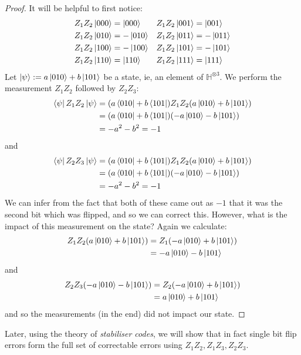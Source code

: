 \documentclass[12pt]{article}
\theoremstyle{plain}
\theoremstyle{definition}
\newcommand{\bb}[1]{\mathbb{#1}}
\begin{document}
\begin{proof}
	It will be helpful to first notice:
	\begin{align*}
		Z_1Z_2\ket{000} &= \ket{000} & Z_1Z_2\ket{001} &= \ket{001}\\
		Z_1Z_2\ket{010} &= -\ket{010} & Z_1Z_2\ket{011} &= -\ket{011}\\
		Z_1Z_2\ket{100} &= -\ket{100} & Z_1Z_2\ket{101} &= -\ket{101}\\
		Z_1Z_2\ket{110} &= \ket{110} &Z_1Z_2 \ket{111} &= \ket{111}
	\end{align*}
	Let $\ket{\psi}:= a\ket{010} + b\ket{101}$ be a state, ie, an element of $\bb{H}^{\otimes 3}$. We perform the measurement $Z_1Z_2$ followed by $Z_2Z_3$:
	\begin{align*}
		\bra{\psi}Z_1Z_2\ket{\psi} &= (a\bra{010} + b\bra{101})Z_1Z_2(a\ket{010} + b\ket{101})\\
		&= (a\bra{010} + b\bra{101})(-a\ket{010} - b\ket{101})\\
		&= -a^2 - b^2 = -1
	\end{align*}
	and
	\begin{align*}
		\bra{\psi}Z_2Z_3\ket{\psi} &= (a\bra{010} + b\bra{101})Z_1Z_2(a\ket{010} + b\ket{101})\\
		&= (a\bra{010} + b\bra{101})(-a\ket{010} - b\ket{101})\\
		&= -a^2 - b^2 = -1
	\end{align*}
	We can infer from the fact that both of these came out as $-1$ that it was the second bit which was flipped, and so we can correct this. However, what is the impact of this measurement on the state? Again we calculate:
	\begin{align*}
		Z_1Z_2(a\ket{010} + b\ket{101}) &= Z_1(-a\ket{010} + b\ket{101})\\
		&= -a\ket{010} - b\ket{101}
	\end{align*}
	and
	\begin{align*}
		Z_2Z_3(-a\ket{010} - b\ket{101}) &= Z_2(-a\ket{010} + b\ket{101})\\
		&= a\ket{010} + b\ket{101}
	\end{align*}
	and so the measurements (in the end) did not impact our state.
\end{proof}
Later, using the theory of \emph{stabiliser codes}, we will show that in fact single bit flip errors form the full set of correctable errors using $Z_1Z_2,Z_1Z_3,Z_2Z_3$.
\end{document}
